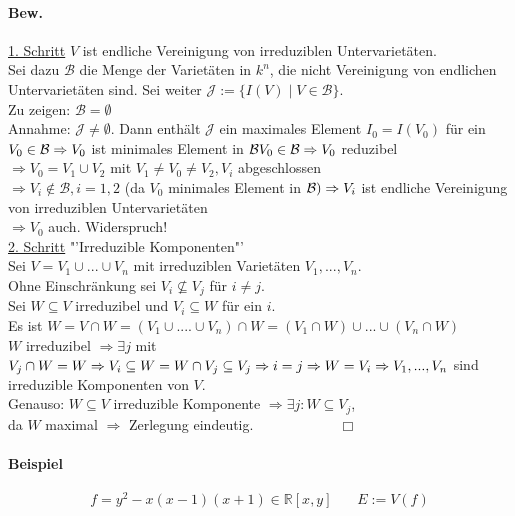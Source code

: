\documentclass[a4paper,12pt]{report}
\theoremstyle{break}
\theoremstyle{nonumberbreak}
\theoremstyle{nonumberplain}
\begin{document}
\paragraph{Bew.}
\underline{1. Schritt} $V$ ist endliche Vereinigung von irreduziblen Untervarietäten.\\
Sei dazu $\mathcal{B}$ die Menge der Varietäten in $k^n$, die nicht Vereinigung von endlichen Untervarietäten sind. Sei weiter $\mathcal{J}:=\{ I(V)\mid V\in \mathcal{B}\}$.\\
Zu zeigen: $\mathcal{B}=\emptyset$\\
Annahme: $\mathcal{J}\neq \emptyset$. Dann enthält $\mathcal{J}$ ein maximales Element $I_0=I(V_0)$ für ein $V_0\in \mathcal{B}\\
\Rightarrow V_0$ ist minimales Element in $\mathcal{B}\\
V_0 \in \mathcal{B} \Rightarrow V_0$ reduzibel\\
$\Rightarrow V_0 = V_1 \cup V_2$ mit $V_1\neq V_0\neq V_2, V_i$ abgeschlossen\\
$\Rightarrow V_i \notin\mathcal{B}, i=1,2$ (da $V_0$ minimales Element in $\mathcal{B})\\
\Rightarrow V_i$ ist endliche Vereinigung von irreduziblen Untervarietäten\\
$\Rightarrow V_0$ auch. Widerspruch!\\
\underline{2. Schritt} "'Irreduzible Komponenten"'\\
Sei $V=V_1\cup ... \cup V_n$ mit irreduziblen Varietäten $V_1,... , V_n$.
\\Ohne Einschränkung sei $V_i\nsubseteq V_j$ für $i\neq j$.\\
Sei $W\subseteq V$ irreduzibel und $V_i\subseteq W$ für ein $i$.\\
Es ist $W=V\cap W= (V_1 \cup .... \cup V_n)\cap W= (V_1 \cap W)\cup ... \cup (V_n \cap W)$\\
$W$ irreduzibel $\Rightarrow\exists j$ mit $V_j\cap W = W\\
\Rightarrow V_i \subseteq W= W \cap V_j\subseteq V_j\Rightarrow i=j \Rightarrow W=V_i\\
\Rightarrow V_1,..., V_n$ sind irreduzible Komponenten von $V$.\\
Genauso: $W\subseteq V$ irreduzible Komponente $\Rightarrow \exists j : W \subseteq V_j$,\\
da $W$ maximal $\Rightarrow$ Zerlegung eindeutig. $~~~~~~~~~~~~~~~~~~~~~~~~~~\Box$
\paragraph{Beispiel}
$$f=y^2-x(x-1)(x+1) \in\mathbb{R}[x,y]~~~~~~~~E:=V(f)$$
\end{document}
